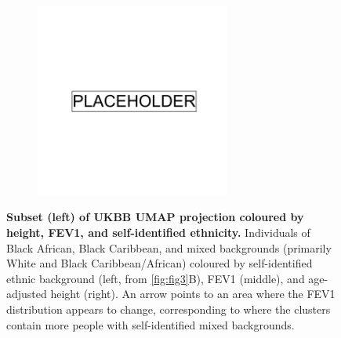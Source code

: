 \newpage

\begin{figure}
    \centering
    \begin{subfigure}{\textwidth}
    \includegraphics[width=0.7\textwidth]{placeholder.png}
    \end{subfigure}
    \caption[Subset (left) of UKBB UMAP projection coloured by height, FEV1, and self-identified ethnicity]{\textbf{Subset (left) of UKBB UMAP projection coloured by height, FEV1, and self-identified ethnicity.} Individuals of Black African, Black Caribbean, and mixed backgrounds (primarily White and Black Caribbean/African) coloured by self-identified ethnic background (left, from \ref{fig:fig3}B), FEV1 (middle), and age-adjusted height (right). An arrow points to an area where the FEV1 distribution appears to change, corresponding to where the clusters contain more people with self-identified mixed backgrounds.}
    \label{fig:supp_comparison_fev_afr}
\end{figure}

\newpage

